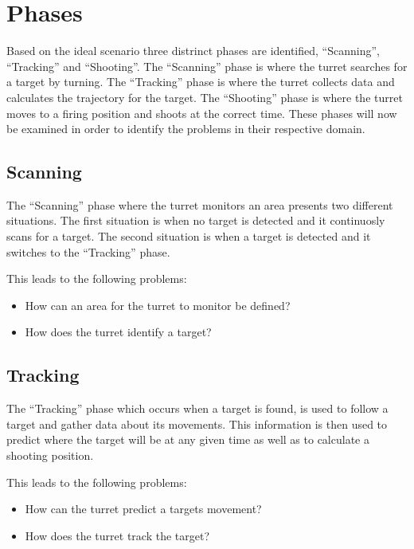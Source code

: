 \section{Phases}
Based on the ideal scenario three distrinct phases are identified,
``Scanning'', ``Tracking'' and ``Shooting''. The ``Scanning'' phase is where
the turret searches for a target by turning. The ``Tracking'' phase is where the
turret collects data and calculates the trajectory for the target. The
``Shooting'' phase is where the turret moves to a firing position and shoots at
the correct time. These phases will now be examined in order to identify the
problems in their respective domain.

\subsection{Scanning}
The ``Scanning'' phase where the turret monitors an area presents two different
situations. The first situation is when no target is detected and it continuosly
scans for a target. The second situation is when a target is detected and it
switches to the ``Tracking'' phase.\nl

This leads to the following problems:
\begin{itemize}
  \item How can an area for the turret to monitor be defined?
  \item How does the turret identify a target?
\end{itemize}

%
%

\subsection{Tracking}
The ``Tracking'' phase which occurs when a target is found, is used to follow a
target and gather data about its movements. This information is then used to
predict where the target will be at any given time as well as to calculate a
shooting position.\nl

This leads to the following problems:
\begin{itemize}
  \item How can the turret predict a targets movement?
  \item How does the turret track the target?
\end{itemize}

